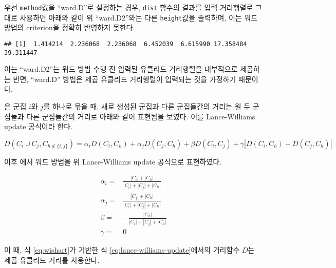 \documentclass[]{book}
\newenvironment{Shaded}{\begin{snugshade}}{\end{snugshade}}
\newcommand{\DataTypeTok}[1]{\textcolor[rgb]{0.13,0.29,0.53}{#1}}
\newcommand{\DecValTok}[1]{\textcolor[rgb]{0.00,0.00,0.81}{#1}}
\newcommand{\KeywordTok}[1]{\textcolor[rgb]{0.13,0.29,0.53}{\textbf{#1}}}
\newcommand{\NormalTok}[1]{#1}
\newcommand{\OperatorTok}[1]{\textcolor[rgb]{0.81,0.36,0.00}{\textbf{#1}}}
\newcommand{\StringTok}[1]{\textcolor[rgb]{0.31,0.60,0.02}{#1}}
\begin{document}
우선 \texttt{method}값을 ``ward.D''로 설정하는 경우, \texttt{dist} 함수의 결과를 입력 거리행렬로 그대로 사용하면 아래와 같이 위 ``ward.D2''와는 다른 \texttt{height}값을 출력하며, 이는 워드 방법의 criterion을 정확히 반영하지 못한다.

\begin{Shaded}
\end{Shaded}

\begin{verbatim}
## [1]  1.414214  2.236068  2.236068  6.452039  6.615990 17.358484 39.311447
\end{verbatim}

이는 ``ward.D2''는 워드 방법 수행 전 입력된 유클리드 거리행렬을 내부적으로 제곱하는 반면, ``ward.D'' 방법은 제곱 유클리드 거리행렬이 입력되는 것을 가정하기 때문이다.

\citet{lance1967general} 은 군집 \(i\)와 \(j\)를 하나로 묶을 때, 새로 생성된 군집과 다른 군집들간의 거리는 원 두 군집들과 다른 군집들간의 거리로 아래와 같이 표현됨을 보였다. 이를 Lance-Williams update 공식이라 한다.

\begin{equation}
D(C_i \cup C_j, C_{h \notin \{i, j\}}) = \alpha_i D(C_i, C_h) + \alpha_j D(C_j, C_h) + \beta D(C_i, C_j) + \gamma |D(C_i, C_h) - D(C_j, C_h)|
\label{eq:lance-williams-update}
\end{equation}

이후 \citet{wishart1969256} 에서 워드 방법을 위 Lance-Williams update 공식으로 표현하였다.

\begin{equation}
\begin{split}
\alpha_i =& \frac{|C_i| + |C_h|}{|C_i| + |C_j| + |C_h|}\\
\alpha_j =& \frac{|C_j| + |C_h|}{|C_i| + |C_j| + |C_h|}\\
\beta =& - \frac{|C_h|}{|C_i| + |C_j| + |C_h|}\\
\gamma =& 0
\end{split}
\label{eq:wishart}
\end{equation}

이 때, 식 \eqref{eq:wishart}가 기반한 식 \eqref{eq:lance-williams-update}에서의 거리함수 \(D\)는 제곱 유클리드 거리를 사용한다.
\end{document}
